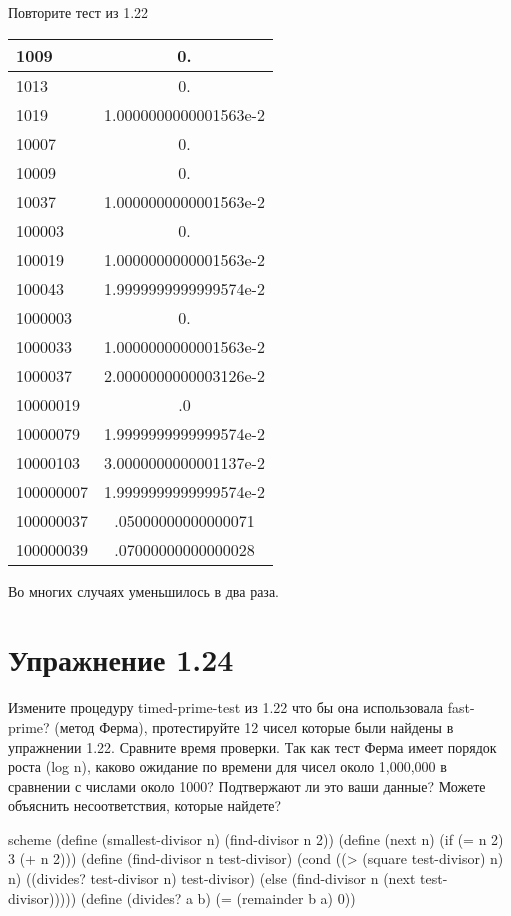 Повторите тест из 1.22

\begin{center}
  \begin{tabular}{ | l | c | }
    \hline
    1009 & 0. \\ \hline
    1013 & 0. \\ \hline
    1019 & 1.0000000000001563e-2 \\ \hline
    10007 & 0. \\ \hline
    10009 & 0. \\ \hline
    10037 & 1.0000000000001563e-2 \\ \hline
    100003 & 0. \\ \hline
    100019 & 1.0000000000001563e-2 \\ \hline
    100043 & 1.9999999999999574e-2 \\ \hline
    1000003 & 0. \\ \hline
    1000033 & 1.0000000000001563e-2 \\ \hline
    1000037 & 2.0000000000003126e-2 \\ \hline
    10000019 & .0 \\ \hline
    10000079 & 1.9999999999999574e-2 \\ \hline
    10000103 & 3.0000000000001137e-2 \\ \hline
    100000007 & 1.9999999999999574e-2 \\ \hline
    100000037 & .05000000000000071 \\ \hline
    100000039 & .07000000000000028 \\ \hline
  \end{tabular}
\end{center}

Во многих случаях уменьшилось в два раза.


\chapter{Упражнение 1.24}

Измените процедуру timed-prime-test из 1.22 что бы она использовала fast-prime? (метод Ферма), протестируйте 12 чисел которые были найдены в упражнении 1.22. Сравните время проверки. Так как тест Ферма имеет порядок роста (log n), каково ожидание по времени для чисел около 1,000,000 в сравнении с числами около 1000? Подтвержают ли это ваши данные? Можете объяснить несоответствия, которые найдете?

\begin{codelisting}{scheme}
(define (smallest-divisor n)
  (find-divisor n 2))
(define (next n)
  (if (= n 2)
      3
      (+ n 2)))
(define (find-divisor n test-divisor)
  (cond ((> (square test-divisor) n) n)
        ((divides? test-divisor n) test-divisor)
        (else (find-divisor n (next test-divisor)))))
(define (divides? a b)
  (= (remainder b a) 0))
\end{codelisting}

